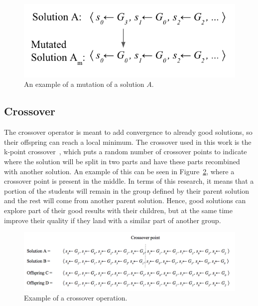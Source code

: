\begin{figure}
    \centering
    \includegraphics{images/mutation_g.png}
    \caption{An example of a mutation of a solution $A$.}
    \label{fig:mutation_ex}
\end{figure}

\subsection{Crossover}
\label{section:crossover_operator}

The crossover operator is meant to add convergence to already good solutions, so their offspring can reach a local minimum. The crossover used in this work is the k-point crossover~\cite{nomura1997analysis}, which puts a random number of crossover points to indicate where the solution will be split in two parts and have these parts recombined with another solution. An example of this can be seen in Figure~\ref{fig:crossover_ex}, where a crossover point is present in the middle. In terms of this research, it means that a portion of the students will remain in the group defined by their parent solution and the rest will come from another parent solution. Hence, good solutions can explore part of their good results with their children, but at the same time improve their quality if they land with a similar part of another group.\\

\begin{figure}[!htp]
    \centering
    \includegraphics[width=1.0\textwidth]{images/cross_over_g.png}
    \caption{Example of a crossover operation.}
    \label{fig:crossover_ex}
\end{figure}


